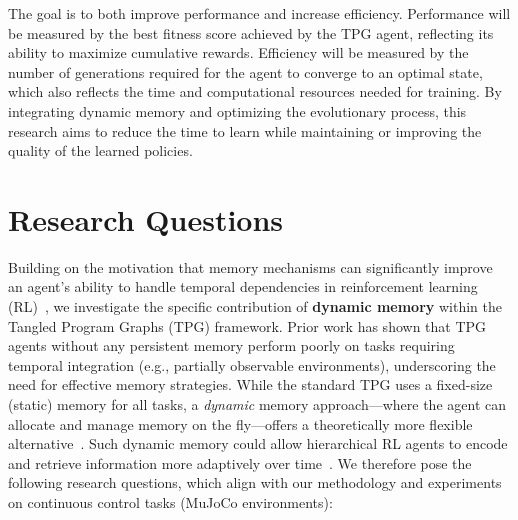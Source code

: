 \documentclass[sigconf]{acmart}
\begin{document}
The goal is to both improve performance and increase efficiency. Performance will be measured by the best fitness score achieved by the TPG agent, reflecting its ability to maximize cumulative rewards. Efficiency will be measured by the number of generations required for the agent to converge to an optimal state, which also reflects the time and computational resources needed for training. By integrating dynamic memory and optimizing the evolutionary process, this research aims to reduce the time to learn while maintaining or improving the quality of the learned policies.

\section{Research Questions}

Building on the motivation that memory mechanisms can significantly improve an agent's ability to handle temporal dependencies in reinforcement learning (RL)~\cite{Djavaherpour24}, we investigate the specific contribution of \textbf{dynamic memory} within the Tangled Program Graphs (TPG) framework. Prior work has shown that TPG agents without any persistent memory perform poorly on tasks requiring temporal integration (e.g., partially observable environments)\cite{Kelly21}, underscoring the need for effective memory strategies. While the standard TPG uses a fixed-size (static) memory for all tasks, a \textit{dynamic} memory approach---where the agent can allocate and manage memory on the fly---offers a theoretically more flexible alternative~\cite{Kelly21TELO}. Such dynamic memory could allow hierarchical RL agents to encode and retrieve information more adaptively over time~\cite{Kelly21TELO}. We therefore pose the following research questions, which align with our methodology and experiments on continuous control tasks (MuJoCo environments):
\end{document}
